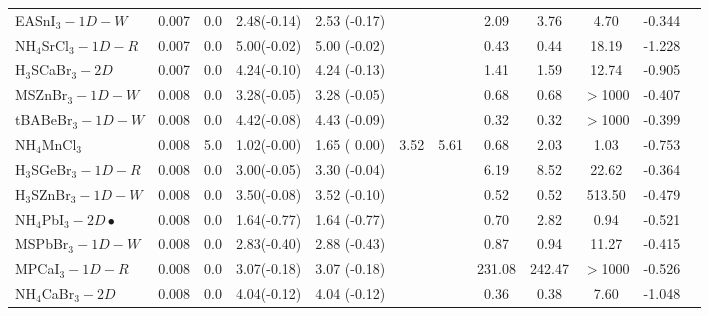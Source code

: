 \begin{table*}
\begin{tabular*}{0.98\textwidth}{@{\extracolsep{\fill}}l c c c c c c c c c c c}
      EASnI$_3-1D-W$&      0.007&        0.0&       2.48(-0.14)&            2.53  (-0.17)&           &                &            2.09&            3.76&            4.70&     -0.344\\
 NH$_4$SrCl$_3-1D-R$&      0.007&        0.0&       5.00(-0.02)&            5.00  (-0.02)&           &                &            0.43&            0.44&           18.19&     -1.228\\
   H$_3$SCaBr$_3-2D$&      0.007&        0.0&       4.24(-0.10)&            4.24  (-0.13)&           &                &            1.41&            1.59&           12.74&     -0.905\\
     MSZnBr$_3-1D-W$&      0.008&        0.0&       3.28(-0.05)&            3.28  (-0.05)&           &                &            0.68&            0.68&         $>$1000&     -0.407\\
    tBABeBr$_3-1D-W$&      0.008&        0.0&       4.42(-0.08)&            4.43  (-0.09)&           &                &            0.32&            0.32&         $>$1000&     -0.399\\
      NH$_4$MnCl$_3$&      0.008&        5.0&       1.02(-0.00)&            1.65  ( 0.00)&       3.52&            5.61&            0.68&            2.03&            1.03&     -0.753\\
 H$_3$SGeBr$_3-1D-R$&      0.008&        0.0&       3.00(-0.05)&            3.30  (-0.04)&           &                &            6.19&            8.52&           22.62&     -0.364\\
 H$_3$SZnBr$_3-1D-W$&      0.008&        0.0&       3.50(-0.08)&            3.52  (-0.10)&           &                &            0.52&            0.52&          513.50&     -0.479\\
NH$_4$PbI$_3-2D\bullet$&      0.008&        0.0&       1.64(-0.77)&            1.64  (-0.77)&           &                &            0.70&            2.82&            0.94&     -0.521\\
     MSPbBr$_3-1D-W$&      0.008&        0.0&       2.83(-0.40)&            2.88  (-0.43)&           &                &            0.87&            0.94&           11.27&     -0.415\\
      MPCaI$_3-1D-R$&      0.008&        0.0&       3.07(-0.18)&            3.07  (-0.18)&           &                &          231.08&          242.47&         $>$1000&     -0.526\\
   NH$_4$CaBr$_3-2D$&      0.008&        0.0&       4.04(-0.12)&            4.04  (-0.12)&           &                &            0.36&            0.38&            7.60&     -1.048\\

\end{tabular*}
\end{table*}
